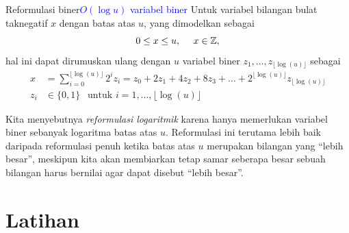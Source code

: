 \begin{general}{Reformulasi biner}{\textcolor{blue}{$O(\log u)$ variabel biner}}
\label{general:log-reformulation}
Untuk variabel bilangan bulat taknegatif $x$ dengan batas atas $u$, yang dimodelkan sebagai
\begin{equation}
0 \leq x \leq u, \ \ \ \ x \in \Z,
\end{equation}
hal ini dapat dirumuskan ulang dengan $u$ variabel biner $z_1, \dots, z_{\lfloor\log( u )\rfloor}$ sebagai
\begin{equation}
\begin{split}
x & = \sum_{i=0}^{\lfloor\log( u )\rfloor}2^i z_i = z_0 + 2 z_1 +  4 z_2 + 8 z_3 + \dots + 2^{\lfloor\log( u )\rfloor} z_{\lfloor\log( u )\rfloor}\\
z_i & \in \{0,1\} \ \ \text{ untuk } i=1, \dots, \lfloor\log( u )\rfloor
\end{split}
\end{equation}
\end{general}
Kita menyebutnya \emph{reformulasi logaritmik} karena hanya memerlukan variabel biner sebanyak logaritma batas atas $u$. Reformulasi ini terutama lebih baik daripada reformulasi penuh ketika batas atas $u$ merupakan bilangan yang ``lebih besar'', meskipun kita akan membiarkan tetap samar seberapa besar sebuah bilangan harus bernilai agar dapat disebut ``lebih besar''.
\fi  %

\section{Latihan}


